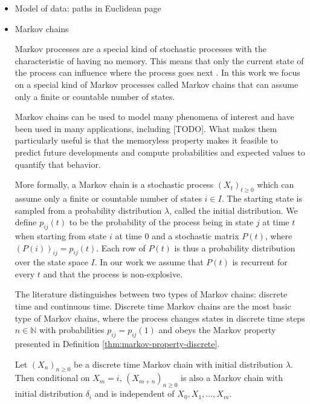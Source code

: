 \label{sec:preliminaries}

\begin{itemize}
\item Model of data: paths in Euclidean page
	\item Markov chains
	
	Markov processes are a special kind of stochastic processes with the characteristic of 
	having no memory. This means that only the current state of the process can influence
	where the process goes next \cite{norris1998markov}. In this work we focus on a special kind
	of Markov processes called Markov chains that can assume only a finite or countable
	number of states.
	
	Markov chains can be used to model many phenomena of interest and have been used in many
	applications, including [TODO]. What makes them particularly useful is that the memoryless
	property makes it feasible to predict future developments and compute probabilities and
	expected values to quantify that behavior.
	
	More formally, a Markov chain is a stochastic process $(X_t)_{t \ge 0}$ which can assume
	only a finite or countable number of states $i \in I$. The starting state
	is sampled from a probability distribution $\lambda$, called the initial distribution.
	We define $p_{ij}(t)$ to be the probability of the process being in state $j$ at time $t$
	when starting from state $i$ at time $0$ and a stochastic matrix $P(t)$, where $\left(P(i)\right)_{ij} = p_{ij}(t)$.
	Each row of $P(t)$ is thus a probability distribution over the state space $I$. In our
	work we assume that $P(t)$ is recurrent for every $t$ and that the process is non-explosive.
	
	The literature distinguishes between two types of Markov chains: discrete time and continuous time.
	Discrete time Markov chains are the most basic type of Markov chains, where the process
	changes states in discrete time steps $n \in \mathbb{N}$ with probabilities $p_{ij} = p_{ij}(1)$
	and obeys the Markov property presented in Definition \ref{thm:markov-property-discrete}.
	
	\begin{defn}
	\label{thm:markov-property-discrete}
	Let $(X_n)_{n \ge 0}$ be a discrete time Markov chain with initial distribution $\lambda$.
	Then conditional on $X_m = i$, $(X_{m + n})_{n \ge 0}$ is also a Markov chain with initial
	distribution $\delta_i$ and is independent of $X_0, X_1, ..., X_m$.
	\end{defn}
	

\end{itemize}
